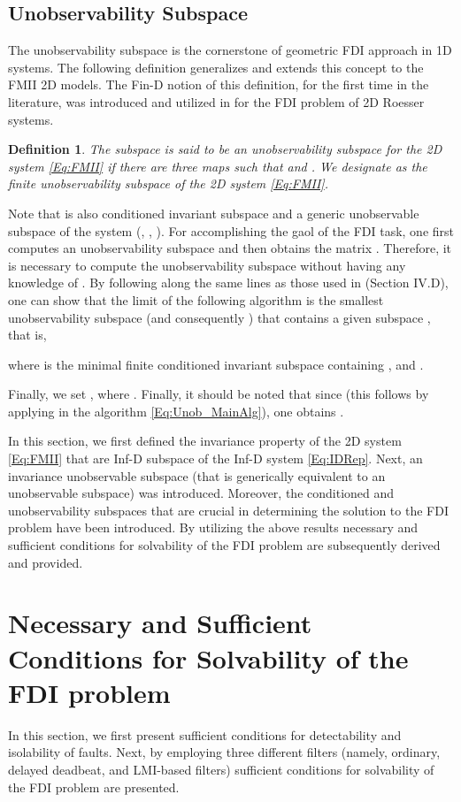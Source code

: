 \documentclass[journal,12pt,draftcls,onecolumn]{IEEEtran}
\newcommand{\infd}{Inf-D }
\def\QEDclosed{\hfill\IEEEQEDclosed}
\renewcommand{\qed}{\QEDclosed}
\newtheorem{definition}{Definition}
\begin{document}
\subsection{Unobservability Subspace}
The unobservability subspace \cite{Mass_Thesis, DrMeskin_Delay} is the cornerstone of geometric FDI approach in 1D systems. The following definition generalizes and extends this concept to the FMII 2D models. The Fin-D notion of this definition, for the first time in the literature, was introduced and utilized in \cite{ACC2013} for the FDI problem of 2D Roesser systems. \begin{definition}\label{Def:Unobser}
	The subspace  is said to be an unobservability subspace for the 2D system \eqref{Eq:FMII} if there are three maps  such that
 and . We designate  as the finite unobservability subspace of the 2D system \eqref{Eq:FMII}.
\qed
\end{definition}
Note that  is also conditioned invariant subspace and a generic unobservable subspace of the system (, , ).
For accomplishing the gaol of the FDI task, one first computes an unobservability subspace and then obtains the matrix  \cite{Mass_Thesis}. Therefore, it is necessary to compute the unobservability subspace without having any knowledge of . By following along the same lines as those used in \cite{ACC2013} (Section IV.D), one can show that the limit of the following algorithm is the smallest unobservability subspace  (and consequently ) that contains a given subspace , that is,

where  is the minimal finite conditioned invariant subspace containing ,  and .

Finally, we set , where . Finally, it should be noted that since  (this follows by applying  in the algorithm \eqref{Eq:Unob_MainAlg}), one obtains .

In this section, we first defined the invariance property of the 2D system \eqref{Eq:FMII} that are Inf-D subspace of the \infd system \eqref{Eq:IDRep}. Next, an invariance unobservable subspace (that is generically equivalent to an unobservable subspace)  was introduced. Moreover, the conditioned and unobservability subspaces that are crucial in determining the solution to the FDI problem have been introduced. By utilizing the above results necessary and sufficient conditions for solvability of the FDI problem are subsequently derived and provided.

\section{Necessary and Sufficient Conditions for Solvability of the FDI problem}\label{Sec:FDI}
In this section, we first present  sufficient conditions for detectability and isolability of faults. Next, by employing three different filters (namely, ordinary, delayed deadbeat, and LMI-based filters) sufficient conditions for solvability of the FDI problem are presented.
\end{document}
